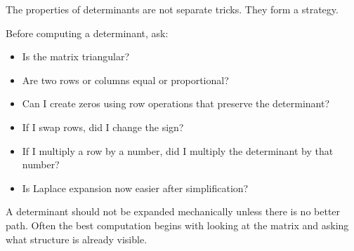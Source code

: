 The properties of determinants are not separate tricks. They form a strategy.

\begin{summarybox}
Before computing a determinant, ask:
\begin{itemize}
\item Is the matrix triangular?
\item Are two rows or columns equal or proportional?
\item Can I create zeros using row operations that preserve the determinant?
\item If I swap rows, did I change the sign?
\item If I multiply a row by a number, did I multiply the determinant by that number?
\item Is Laplace expansion now easier after simplification?
\end{itemize}
\end{summarybox}

A determinant should not be expanded mechanically unless there is no better path. Often the best computation begins with looking at the matrix and asking what structure is already visible.
